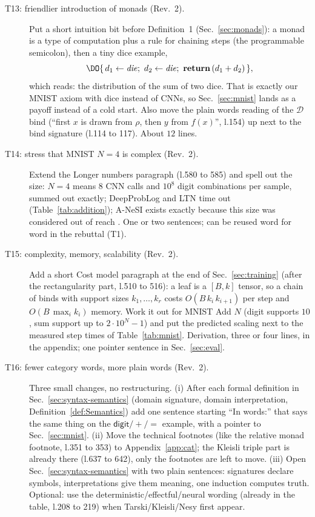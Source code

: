 \documentclass[anon]{../../journal-templates/NeSy26/nesy2026} %
\begin{document}
\begin{description}

\item[T13: friendlier introduction of monads (Rev.~2).]
Put a short intuition bit before Definition~1 (Sec.~\ref{sec:monads}): a
monad is a type of computation plus a rule for chaining steps (the
programmable semicolon), then a tiny dice example,
\[
  \DO\{\, d_1 \leftarrow \mathit{die};\ d_2 \leftarrow \mathit{die};\
  \mathbf{return}\,(d_1 + d_2) \,\},
\]
which reads: the distribution of the sum of two dice. That is exactly our
MNIST axiom with dice instead of CNNs, so Sec.~\ref{sec:mnist} lands as a
payoff instead of a cold start. Also move the plain words reading of the
$\mathcal D$ bind (``first $x$ is drawn from $\rho$, then $y$ from
$f(x)$'', l.154) up next to the bind signature (l.114 to 117). About $12$
lines.

\item[T14: stress that MNIST $N{=}4$ is complex (Rev.~2).]
Extend the Longer numbers paragraph (l.580 to 585) and spell out the size:
$N{=}4$ means $8$ CNN calls and $10^{8}$ digit combinations per sample,
summed out exactly; DeepProbLog and LTN time out
(Table~\ref{tab:addition}); A-NeSI exists exactly because this size was
considered out of reach \citep{kriekenANeSI2023}. One or two sentences; can
be reused word for word in the rebuttal (T1).

\item[T15: complexity, memory, scalability (Rev.~2).]
Add a short Cost model paragraph at the end of Sec.~\ref{sec:training}
(after the rectangularity part, l.510 to 516): a leaf is a $[B,k]$ tensor,
so a chain of binds with support sizes $k_1,\dots,k_r$ costs
$O(B\,k_i\,k_{i+1})$ per step and $O(B\,\max_i k_i)$ memory. Work it out
for MNIST Add $N$ (digit supports $10$, sum support up to
$2\cdot 10^{N}{-}1$) and put the predicted scaling next to the measured
step times of Table~\ref{tab:mnist}. Derivation, three or four lines, in
the appendix; one pointer sentence in Sec.~\ref{sec:eval}.

\item[T16: fewer category words, more plain words (Rev.~2).]
Three small changes, no restructuring. (i) After each formal definition in
Sec.~\ref{sec:syntax-semantics} (domain signature, domain interpretation,
Definition~\ref{def:Semantics}) add one sentence starting ``In words:''
that says the same thing on the $\mathsf{digit}/{+}/{=}$ example, with a
pointer to Sec.~\ref{sec:mnist}. (ii) Move the technical footnotes (like
the relative monad footnote, l.351 to 353) to Appendix~\ref{app:cat}; the
Kleisli triple part is already there (l.637 to 642), only the footnotes are
left to move. (iii) Open Sec.~\ref{sec:syntax-semantics} with two plain
sentences: signatures declare symbols, interpretations give them meaning,
one induction computes truth. Optional: use the
deterministic/effectful/neural wording (already in the table, l.208 to
219) when Tarski/Kleisli/Nesy first appear.

\end{description}
\endgroup
\end{document}
